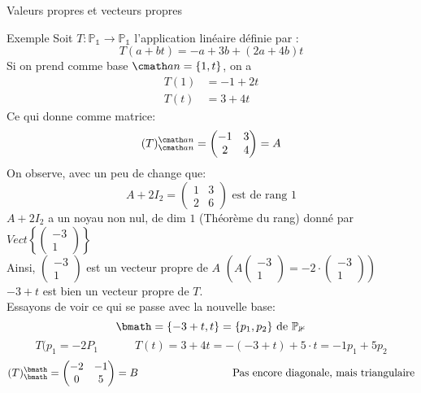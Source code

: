 \begin{parag}{Valeurs propres et vecteurs propres}
    \begin{subparag}{Exemple}
        Soit $T : \mathbb{P_1} \to \mathbb{P_1}$ l'application linéaire définie par : 
        \[T(a + bt) = -a + 3b + (2a + 4b)t\]
        Si on prend comme base $\cmath an = \{1, t\}$, on a
        \begin{align*}
            T(1) &= -1 + 2t\\
            T(t) &= 3 + 4t
        \end{align*}
        Ce qui donne comme matrice:
        \[(T)_{\cmath an}^{\cmath an} = \begin{pmatrix}
            -1  & 3 \\ 2 &  4
        \end{pmatrix} = A\]
        On observe, avec un peu de change que:
        \[A + 2I_2 = \begin{pmatrix}
            1 & 3 \\ 2 & 6
        \end{pmatrix} \text{ est de rang }1\]
        $A + 2I_2$ a un noyau non nul, de dim $1$ (Théorème du rang) donné par $Vect\left\{ \begin{pmatrix}
            -3 \\ 1
        \end{pmatrix}\right\}$\\
        Ainsi, $\begin{pmatrix}
            -3 \\ 1
        \end{pmatrix}$ est un vecteur propre de $A$ $\left(A\begin{pmatrix}
            -3 \\ 1
        \end{pmatrix} = -2 \cdot\begin{pmatrix}
            -3 \\ 1
        \end{pmatrix}\right)$\\
        $-3 + t$ est bien un vecteur propre de $T$.\\
        Essayons de voir ce qui se passe avec la nouvelle base:
        \[\bmath = \{-3 + t, t\} = \{p_1, p_2\} \text{ de } \mathbb{P_1}\]
        \[T(p_1= -2P_1 \; \; \; \hspace{1cm} T(t) = 3 + 4t = -(-3 + t) + 5\cdot t = -1 p_1 + 5p_2\]
        \[(T)_\bmath^\bmath = \begin{pmatrix}
            -2 & -1 \\ 0 & 5
        \end{pmatrix} = B \hspace{3cm} \text{ Pas encore diagonale, mais triangulaire}\]

\end{subparag}
\end{parag}
